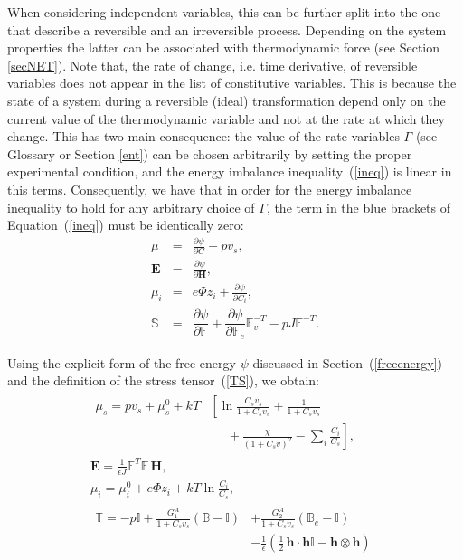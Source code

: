 \documentclass[runningheads]{llncs}
\newcommand{\F}{\ensuremath{\mathbb{F}}}
\begin{document}
When considering independent variables, this can be further split into the one that describe a reversible and an irreversible process. Depending on the system properties the latter can be associated with thermodynamic force (see Section \ref{secNET}). Note that, the rate of change, i.e. time derivative, of reversible variables does not appear in the list of constitutive variables. This is because the state of a system during a reversible (ideal) transformation depend only on the current value of the thermodynamic variable and not at the rate at which they change\cite{NET}.
This has two main consequence: the value of the rate variables $\Gamma$ (see Glossary or Section \ref{ent}) can be chosen arbitrarily by setting the proper experimental condition, and the energy imbalance inequality~(\ref{ineq}) is linear in this terms. Consequently, we have that in order for the energy imbalance inequality to hold for any arbitrary choice of $\Gamma$, the term in the blue brackets of Equation~(\ref{ineq}) must be identically zero: 
\begin{eqnarray}
\mu &=& \frac{\partial \psi}{\partial C}+ p v_s,\\[2mm]
\mathbf{E} &=& \frac{\partial \psi}{\partial \mathbf{H}},\\[2mm]
\mu_i &=& e\Phi z_i + \frac{\partial \psi}{\partial C_i},\\[2mm]
\mathbb{S} &=&  \dfrac{\partial \psi}{\partial \F} + \dfrac{\partial \psi}{\partial \F_e}\F_v^{-T}- p J \F^{-T}.
\end{eqnarray}

Using the explicit form of the free-energy $\psi$ discussed in Section~(\ref{freeenergy}) and the definition of the stress tensor~(\ref{TS}), we obtain:
\begin{gather}
\begin{aligned}
\mu_s = p v_s + \mu_s^0+ kT&\left[\ln \frac{C_s v_s}{1+C_s v_s} + \frac{1}{1+C_sv_s}\right.
\\&\left.\ \ \ \ \ \ +\frac{\chi}{(1+C_s v)^2}-\sum_i \frac{C_i}{C_s}\right], 
\end{aligned}\label{temp8}\\
\mathbf{E} = \frac{1}{\epsilon J} \F^T \F\, \mathbf{H},\label{temp6}\\[2mm]
\mu_i = \mu^0_i + e\Phi z_i + kT \ln \frac{C_i}{ C_s},\\[2mm]
\begin{aligned}
\mathbb{T}= -p \mathbb{I} + \frac{G^A_1}{1+C_sv_s}\left(\mathbb{B}-\mathbb{I}\right) &+ \frac{G^A_2}{1+C_sv_s}\left(\mathbb{B}_e-\mathbb{I}\right)\\ &- \frac{1}{\epsilon} \left(\frac{1}{2} \,\mathbf{h}\cdot  \mathbf{h} \mathbb{I} -\mathbf{h} \otimes \mathbf{h}\right).\label{temp7}
\end{aligned}
\end{gather}
\end{document}
